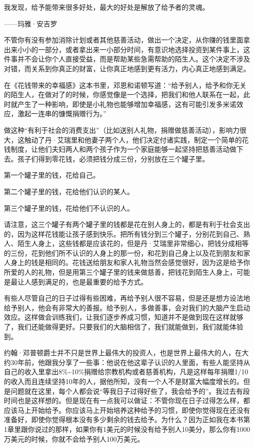 \begin{BookQuote}
我发现，给予能带来很多好处，最大的好处是解放了给予者的灵魂。

\hfill ——玛雅·安吉罗
\end{BookQuote}

不管你有没有参加消除计划或者其他慈善活动，做出一个决定，从你赚的钱里面拿出来小小的一部分，或者拿出来一小部分时间，有意识地选择投资到某件事上，这件事并不会让你个人直接受益，而是帮助某些急需帮助的陌生人。这个决定不涉及对错，而关系到你真正的财富，让你真正地感到更有活力，内心真正地感到满足。

在《花钱带来的幸福感》这本书里，邓恩和诺顿写道：“给予别人，给予和你无关的陌生人，在做对了的时候，你感觉像是一个选择，把我们和他人联系在一起，此时就产生了一种影响，即使是小礼物也能够增加幸福感，这有可能引发多米诺效应，激起一连串的慷慨捐赠行为。”

做这种“有利于社会的消费支出”（比如送别人礼物，捐赠做慈善活动），影响力很大，这触动了丹·艾瑞里和他妻子两个人，他们决定付诸实践，制定一个简单的花钱制度，让他们夫妇两人和两个孩子作为一个家庭能够一起坚持把慈善活动做下去。孩子们得到零花钱，必须把钱分成三份，分别放在三个罐子里。

第一个罐子里的钱，花给自己。

第二个罐子里的钱，花给他们认识的某人。

第三个罐子里的钱，花给他们不认识的人。

请注意，这三个罐子有两个罐子里的钱都是花在别人身上的，都是有利于社会支出的，因为这样花钱能让孩子感到快乐。把所有钱分到三个罐子，分别花到自己、熟人、陌生人身上，这些钱都是应该花的，但是丹·艾瑞里非常细心，把钱分成相等的三份，花到他们所不认识的人身上的那一份，和花到自己身上以及花到朋友和家人身上的钱是相同的。花钱送给朋友和家人礼物当然会感觉很好，因为这是给予你所爱的人的礼物，但是用第三个罐子里的钱来做慈善，把钱花到陌生人身上，可能是最让人感到满足的，也是最重要的给予方式。

有些人尽管自己的日子过得有些困难，再给予别人很不容易，但是还是想方设法地给予别人，他会有非常大的善报。给予别人，多做善事，会对我们的大脑产生启动效应。这样做会训练我们，让我们逐步养成习惯，知道并不是做到现在这样就够了，我们还能做得更好。只要我们的大脑相信了，我们就能做到，我们就能体验到。

约翰·邓普顿爵士并不只是世界上最伟大的投资人，也是世界上最伟大的人，在大约30年前，他跟我分享了一些事：他说在他这辈子认识的人里面，有些人能坚持从自己的收入里拿出8\%\textasciitilde{}10\%捐赠给宗教机构或者慈善机构，凡是这样每年捐赠1/10的收入而且连续坚持10年的人，据他所知，没有一个人不是财富大幅度增长的。但是问题就在这里，每个人都会说“等我日子过得好些了，我会给予的”。我过去有段时间也是这样想的。但是现在有一点我可以做证：不管你现在日子过得怎么样，都应该马上开始给予。你应该马上开始培养这种给予的习惯，即使你觉得现在还没有准备好，即使你觉得根本没有多少剩余的钱去给予。为什么？因为正如我在本书第1章里跟你说过的那样，如果你有1美元的时候没有给予别人10美分，那么你有1000万美元的时候，你就不会给予别人100万美元。

